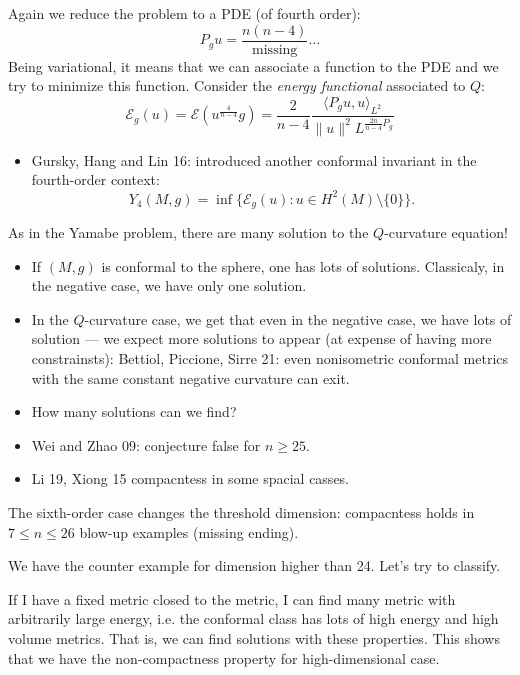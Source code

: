 Again we reduce the problem to a PDE (of
fourth order):
$$
P_gu=\frac{n(n-4)}{\operatorname{missing}}…
$$
Being variational, it means that we can
associate a function to the PDE and we try
to minimize this function.
Consider the {\it energy functional}
associated to $Q$:
$$
\mathcal{E}_g(u) =
\mathcal{E}\left(u^{\frac{4}{n-4}}g\right)
=\frac{2}{n-4}\frac{\langle
P_gu,u\rangle_{L^2}}{\|u\|^2L^{\frac{2n}{n-4}P_g}}
$$

\begin{itemize}
\item Gursky, Hang and Lin 16: introduced
another conformal invariant in the
fourth-order context:
$$
Y_4(M,g)
=
\operatorname{inf} \{\mathcal{E}_g(u)
: u \in H^2(M)\setminus \{0\}\}.
$$
\end{itemize}

\noindent
As in the Yamabe problem, there are many
solution to the $Q$-curvature equation!

\begin{itemize}
\item If $(M,g)$ is conformal to the sphere,
one has lots of solutions.
Classicaly, in the negative case, we have
only one solution.

\item In the $Q$-curvature case, we get that
even in the negative case, we have lots of
solution --- we expect more solutions to
appear (at expense of having more
constrainsts):
Bettiol, Piccione, Sirre 21: even
nonisometric conformal metrics with the same
constant negative curvature can exit.

\item How many solutions can we
find? 

\item Wei and Zhao 09: conjecture false for
$n \geq  25$.
\item Li 19, Xiong 15 compacntess in some
spacial casses.
\end{itemize}

\begin{remark}
\label{remark-curious}
The sixth-order case changes the threshold
dimension: compacntess holds in $7 \leq n
\leq  26$ blow-up examples (missing ending).
\end{remark}

\noindent
We have the counter example for dimension
higher than 24. Let's try to classify.

If I have a fixed metric closed to the
metric, I can find many metric with
arbitrarily large energy, i.e. the conformal
class has lots of high energy and high
volume metrics. That is, we can find
solutions with these properties. This shows
that we have the non-compactness property
for high-dimensional case.

